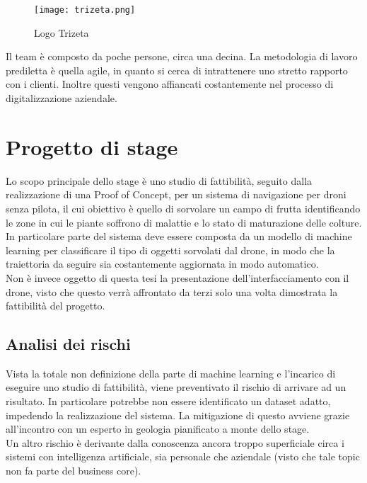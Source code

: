 \begin{figure}[!h]
	\centering 
	\texttt{[image: trizeta.png]}
	\caption{Logo Trizeta}
\end{figure}

Il team è composto da poche persone, circa una decina. La metodologia di lavoro prediletta è quella agile, in quanto si cerca di intrattenere uno
stretto rapporto con i clienti. Inoltre questi vengono affiancati costantemente nel processo di digitalizzazione aziendale.

\section{Progetto di stage}

Lo scopo principale dello stage è uno studio di fattibilità, seguito dalla realizzazione di una Proof of Concept, per un sistema di navigazione
per droni senza pilota, il cui obiettivo è quello di sorvolare un campo di frutta identificando le zone in cui le piante soffrono di malattie e lo stato
di maturazione delle colture.\\
In particolare parte del sistema deve essere composta da un modello di machine learning per classificare il tipo di oggetti sorvolati dal drone,
in modo che la traiettoria da seguire sia costantemente aggiornata in modo automatico.\\
Non è invece oggetto di questa tesi la presentazione dell'interfacciamento con il drone, visto che questo verrà affrontato da terzi solo una volta dimostrata
la fattibilità del progetto.

\subsection{Analisi dei rischi}
Vista la totale non definizione della parte di machine learning e l'incarico di eseguire uno studio di fattibilità, viene preventivato il rischio di arrivare ad un risultato.
In particolare potrebbe non essere identificato un dataset adatto, impedendo la realizzazione del sistema. La mitigazione di questo avviene grazie
all'incontro con un esperto in geologia pianificato a monte dello stage.\\
Un altro rischio è derivante dalla conoscenza ancora troppo superficiale circa i sistemi con intelligenza artificiale, sia personale che aziendale (visto che tale
topic non fa parte del business core).

